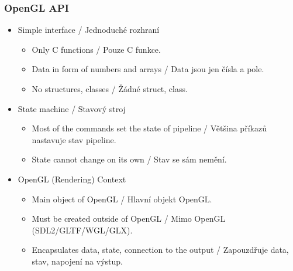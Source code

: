 \begin{frame}\frametitle{OpenGL API}
\scriptsize
\begin{itemize}
  \item Simple interface / Jednoduché rozhraní
    \begin{itemize}\scriptsize
      \item Only C functions / Pouze C funkce.
      \item Data in form of numbers and arrays / Data jsou jen čísla a pole.
      \item No structures, classes / Žádné struct, class.
    \end{itemize}
  \item State machine / Stavový stroj
    \begin{itemize}\scriptsize
      \item Most of the commands set the state of pipeline / Většina příkazů nastavuje stav pipeline.
      \item State cannot change on its own / Stav se sám nemění.
    \end{itemize}
  \item OpenGL (Rendering) Context
    \begin{itemize}\scriptsize
      \item Main object of OpenGL / Hlavní objekt OpenGL.
      \item Must be created outside of OpenGL / Mimo OpenGL (SDL2/GLTF/WGL/GLX).
      \item Encapsulates data, state, connection to the output / Zapouzdřuje data, stav, napojení na výstup.
    \end{itemize}
\end{itemize}
\end{frame}

